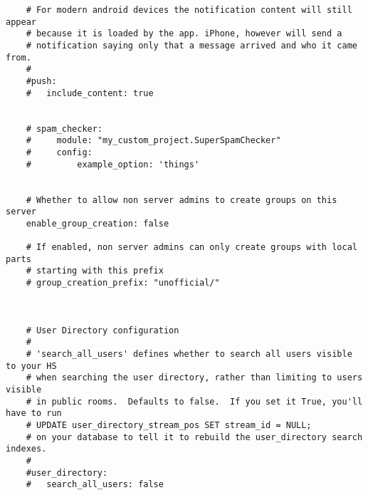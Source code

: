 \begin{lstlisting}
    # For modern android devices the notification content will still appear
    # because it is loaded by the app. iPhone, however will send a
    # notification saying only that a message arrived and who it came from.
    #
    #push:
    #   include_content: true
    
    
    # spam_checker:
    #     module: "my_custom_project.SuperSpamChecker"
    #     config:
    #         example_option: 'things'
    
    
    # Whether to allow non server admins to create groups on this server
    enable_group_creation: false
    
    # If enabled, non server admins can only create groups with local parts
    # starting with this prefix
    # group_creation_prefix: "unofficial/"
    
    
    
    # User Directory configuration
    #
    # 'search_all_users' defines whether to search all users visible to your HS
    # when searching the user directory, rather than limiting to users visible
    # in public rooms.  Defaults to false.  If you set it True, you'll have to run
    # UPDATE user_directory_stream_pos SET stream_id = NULL;
    # on your database to tell it to rebuild the user_directory search indexes.
    #
    #user_directory:
    #   search_all_users: false
\end{lstlisting}


